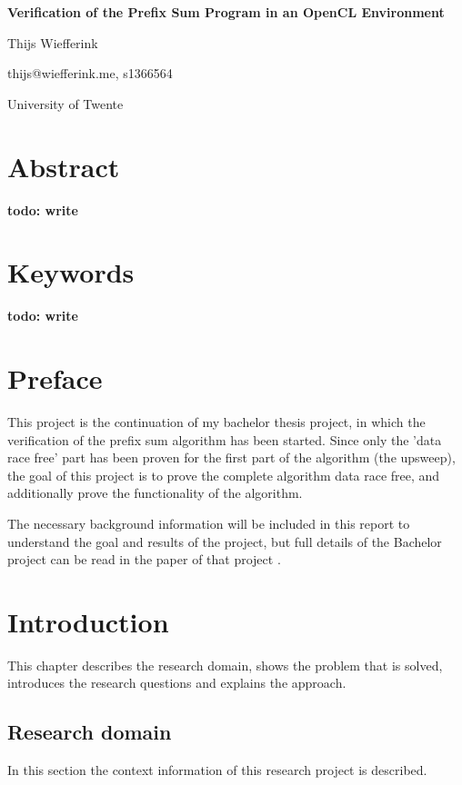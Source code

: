 \documentclass[a4paper]{article}
\newcommand{\todo}[1]{{\color{BurntOrange}\sffamily\textbf{todo: #1}\par}}
\begin{document}
\begin{titlepage}
	\begin{center}
		{\huge\bfseries Verification of the Prefix Sum Program in an OpenCL Environment\par}
		
		\vspace{1cm}
		{\LARGE Thijs Wiefferink\par}
		{\large thijs@wiefferink.me, s1366564}
		
		\vfill
		
		{\Large
			University of Twente		
		}
	\end{center}

\end{titlepage}
\newpage


\section*{Abstract}
\todo{write}


\section*{Keywords}
\todo{write}


\section*{Preface}
This project is the continuation of my bachelor thesis project, in which the verification of the prefix sum algorithm has been started. Since only the 'data race free' part has been proven for the first part of the algorithm (the upsweep), the goal of this project is to prove the complete algorithm data race free, and additionally prove the functionality of the algorithm.

The necessary background information will be included in this report to understand the goal and results of the project, but full details of the Bachelor project can be read in the paper of that project \cite{bachelorThesis}.


\newpage
\tableofcontents


\section{Introduction}
This chapter describes the research domain, shows the problem that is solved, introduces the research questions and explains the approach.

\subsection{Research domain}
In this section the context information of this research project is described.
\end{document}
